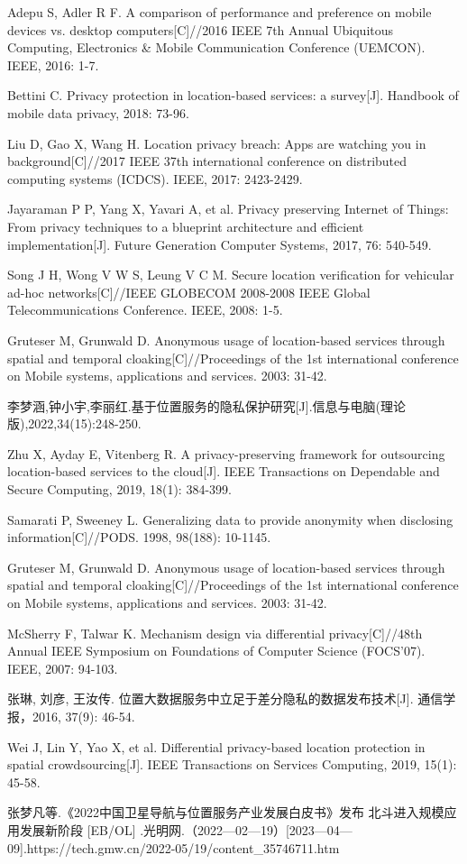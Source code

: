 \documentclass[zihao=-4]{ctexart}
\begin{document}
\begin{thebibliography}{2}
	Adepu S, Adler R F. A comparison of performance and preference on mobile devices vs. desktop computers[C]//2016 IEEE 7th Annual Ubiquitous Computing, Electronics \& Mobile Communication Conference (UEMCON). IEEE, 2016: 1-7.
	
	Bettini C. Privacy protection in location-based services: a survey[J]. Handbook of mobile data privacy, 2018: 73-96.
	
	Liu D, Gao X, Wang H. Location privacy breach: Apps are watching you in background[C]//2017 IEEE 37th international conference on distributed computing systems (ICDCS). IEEE, 2017: 2423-2429.
	
	Jayaraman P P, Yang X, Yavari A, et al. Privacy preserving Internet of Things: From privacy techniques to a blueprint architecture and efficient implementation[J]. Future Generation Computer Systems, 2017, 76: 540-549.
	
	Song J H, Wong V W S, Leung V C M. Secure location verification for vehicular ad-hoc networks[C]//IEEE GLOBECOM 2008-2008 IEEE Global Telecommunications Conference. IEEE, 2008: 1-5.
	
	Gruteser M, Grunwald D. Anonymous usage of location-based services through spatial and temporal cloaking[C]//Proceedings of the 1st international conference on Mobile systems, applications and services. 2003: 31-42.
	
	李梦涵,钟小宇,李丽红.基于位置服务的隐私保护研究[J].信息与电脑(理论版),2022,34(15):248-250.
	
	Zhu X, Ayday E, Vitenberg R. A privacy-preserving framework for outsourcing location-based services to the cloud[J]. IEEE Transactions on Dependable and Secure Computing, 2019, 18(1): 384-399.
	
	Samarati P, Sweeney L. Generalizing data to provide anonymity when disclosing information[C]//PODS. 1998, 98(188): 10-1145.
	
	Gruteser M, Grunwald D. Anonymous usage of location-based services through spatial and temporal cloaking[C]//Proceedings of the 1st international conference on Mobile systems, applications and services. 2003: 31-42.
	
	McSherry F, Talwar K. Mechanism design via differential privacy[C]//48th Annual IEEE Symposium on Foundations of Computer Science (FOCS'07). IEEE, 2007: 94-103.
	
	张琳, 刘彦, 王汝传. 位置大数据服务中立足于差分隐私的数据发布技术[J]. 通信学报，2016, 37(9): 46-54.
	
	Wei J, Lin Y, Yao X, et al. Differential privacy-based location protection in spatial crowdsourcing[J]. IEEE Transactions on Services Computing, 2019, 15(1): 45-58.
	
	张梦凡等.《2022中国卫星导航与位置服务产业发展白皮书》发布 北斗进入规模应用发展新阶段  [EB/OL] .光明网.（2022—02—19）[2023—04—09].https://tech.gmw.cn/2022-05/19/content\_35746711.htm
	
	
\end{thebibliography}
\end{document}
